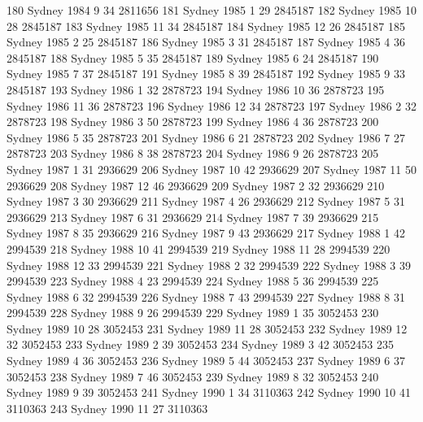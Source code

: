 \documentclass[a4paper]{article}                %
\begin{document}
\begin{Schunk}
\begin{Soutput}
180   Sydney  1984     9      34 2811656
181   Sydney  1985     1      29 2845187
182   Sydney  1985    10      28 2845187
183   Sydney  1985    11      34 2845187
184   Sydney  1985    12      26 2845187
185   Sydney  1985     2      25 2845187
186   Sydney  1985     3      31 2845187
187   Sydney  1985     4      36 2845187
188   Sydney  1985     5      35 2845187
189   Sydney  1985     6      24 2845187
190   Sydney  1985     7      37 2845187
191   Sydney  1985     8      39 2845187
192   Sydney  1985     9      33 2845187
193   Sydney  1986     1      32 2878723
194   Sydney  1986    10      36 2878723
195   Sydney  1986    11      36 2878723
196   Sydney  1986    12      34 2878723
197   Sydney  1986     2      32 2878723
198   Sydney  1986     3      50 2878723
199   Sydney  1986     4      36 2878723
200   Sydney  1986     5      35 2878723
201   Sydney  1986     6      21 2878723
202   Sydney  1986     7      27 2878723
203   Sydney  1986     8      38 2878723
204   Sydney  1986     9      26 2878723
205   Sydney  1987     1      31 2936629
206   Sydney  1987    10      42 2936629
207   Sydney  1987    11      50 2936629
208   Sydney  1987    12      46 2936629
209   Sydney  1987     2      32 2936629
210   Sydney  1987     3      30 2936629
211   Sydney  1987     4      26 2936629
212   Sydney  1987     5      31 2936629
213   Sydney  1987     6      31 2936629
214   Sydney  1987     7      39 2936629
215   Sydney  1987     8      35 2936629
216   Sydney  1987     9      43 2936629
217   Sydney  1988     1      42 2994539
218   Sydney  1988    10      41 2994539
219   Sydney  1988    11      28 2994539
220   Sydney  1988    12      33 2994539
221   Sydney  1988     2      32 2994539
222   Sydney  1988     3      39 2994539
223   Sydney  1988     4      23 2994539
224   Sydney  1988     5      36 2994539
225   Sydney  1988     6      32 2994539
226   Sydney  1988     7      43 2994539
227   Sydney  1988     8      31 2994539
228   Sydney  1988     9      26 2994539
229   Sydney  1989     1      35 3052453
230   Sydney  1989    10      28 3052453
231   Sydney  1989    11      28 3052453
232   Sydney  1989    12      32 3052453
233   Sydney  1989     2      39 3052453
234   Sydney  1989     3      42 3052453
235   Sydney  1989     4      36 3052453
236   Sydney  1989     5      44 3052453
237   Sydney  1989     6      37 3052453
238   Sydney  1989     7      46 3052453
239   Sydney  1989     8      32 3052453
240   Sydney  1989     9      39 3052453
241   Sydney  1990     1      34 3110363
242   Sydney  1990    10      41 3110363
243   Sydney  1990    11      27 3110363

\end{Soutput}
\end{Schunk}
\end{document}
